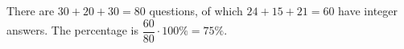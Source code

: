 There are $30+20+30=80$ questions, of which $24+15+21=60$ have integer answers. The percentage is $\dfrac{60}{80}\cdot100\%=\boxed{75\%}$.
